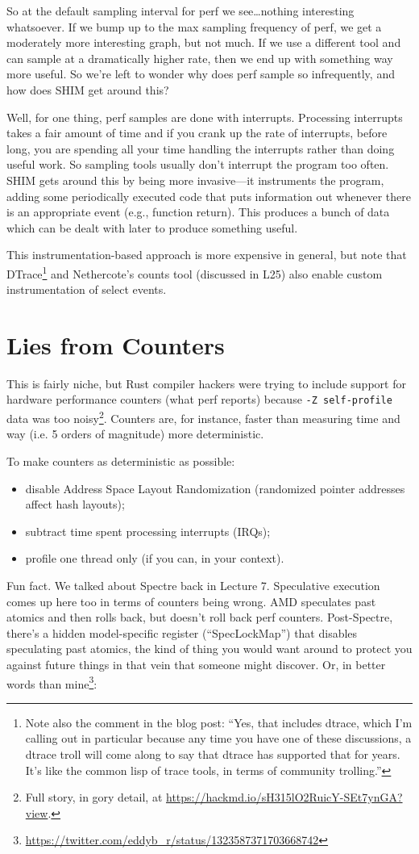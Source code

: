 So at the default sampling interval for perf we see\ldots nothing interesting whatsoever. If we bump up to the max sampling frequency of perf, we get a moderately more interesting graph, but not much. If we use a different tool and can sample at a dramatically higher rate, then we end up with something way more useful. So we're left to wonder why does perf sample so infrequently, and how does SHIM get around this?

Well, for one thing, perf samples are done with interrupts. Processing interrupts takes a fair amount of time and if you crank up the rate of interrupts, before long, you are spending all your time handling the interrupts rather than doing useful work. So sampling tools usually don't interrupt the program too often. SHIM gets around this by being more invasive---it instruments the program, adding some periodically executed code that puts information out whenever there is an appropriate event (e.g., function return). This produces a bunch of data which can be dealt with later to produce something useful.

This instrumentation-based approach is more expensive in general, but note that DTrace\footnote{Note also the comment in the blog post: ``Yes, that includes dtrace, which I'm calling out in particular because any time you have one of these discussions, a dtrace troll will come along to say that dtrace has supported that for years. It's like the common lisp of trace tools, in terms of community trolling.''} and Nethercote's counts tool (discussed in L25) also enable custom instrumentation of select events. 

\section*{Lies from Counters}
This is fairly niche, but Rust compiler hackers were trying to include
support for hardware performance counters (what perf reports) because
{\tt -Z self-profile} data was too noisy\footnote{Full story, in gory
detail,
at \url{https://hackmd.io/sH315lO2RuicY-SEt7ynGA?view}.}. Counters
are, for instance, faster than measuring time and way (i.e. 5 orders of magnitude) more deterministic.

To make counters as deterministic as possible:
\begin{itemize}[noitemsep]
\item disable Address Space Layout Randomization (randomized pointer addresses affect hash layouts);
\item subtract time spent processing interrupts (IRQs);
\item profile one thread only (if you can, in your context).
\end{itemize}
Fun fact. We talked about Spectre back in Lecture 7. Speculative execution comes up here too in terms of
counters being wrong. AMD speculates past atomics and then rolls back, but doesn't roll back perf counters.
Post-Spectre, there's a hidden model-specific register (``SpecLockMap'') that disables speculating past atomics, the kind of thing you would
want around to protect you against future things in that vein that someone might discover. Or, in better words than mine\footnote{\url{https://twitter.com/eddyb_r/status/1323587371703668742}}:

